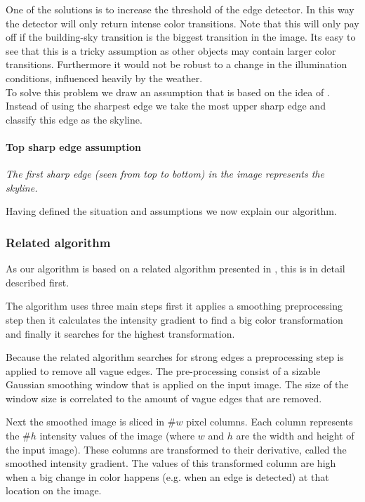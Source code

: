 One of the solutions is to increase the threshold of the edge detector. In this
way the detector will only return intense color transitions. Note that this will
only pay off if the building-sky transition is the biggest transition in the image. 
Its easy to see that this is a tricky assumption as other objects may contain
larger color transitions. Furthermore it would not be robust to a change in
the illumination conditions, influenced heavily by the weather.\\

To solve this problem we draw an assumption that is based on the
idea of \cite{Rover}. Instead of using the sharpest edge we take the most upper sharp
edge and classify this edge as the skyline.\\

\paragraph{Top sharp edge assumption}
\emph{The first sharp edge (seen from top to bottom) in the image 
represents the skyline.}

Having defined the situation and assumptions we now explain our algorithm.

\subsubsection{Related algorithm}
As our algorithm is based on a related algorithm presented in \cite{Rover},
this is in detail described first.

The algorithm uses three main steps first it applies a smoothing preprocessing
step then it calculates the intensity gradient to find a big color transformation
and finally it searches for the highest transformation.

Because the related algorithm searches for strong edges a preprocessing step is
applied to remove all vague edges. The pre-processing consist of a sizable Gaussian
smoothing window that is applied on the input image. The size of the window size
is correlated to the amount of vague edges that are removed.

Next the smoothed image is sliced in \#$w$ pixel columns. Each column represents
the \#$h$ intensity values of the image (where $w$ and $h$ are the width and height of
the input image). 
These columns are transformed to their derivative, called the smoothed intensity gradient. The values
of this transformed column are high when a big change in color happens (e.g.
when an edge is detected) at that location on the image.\\

